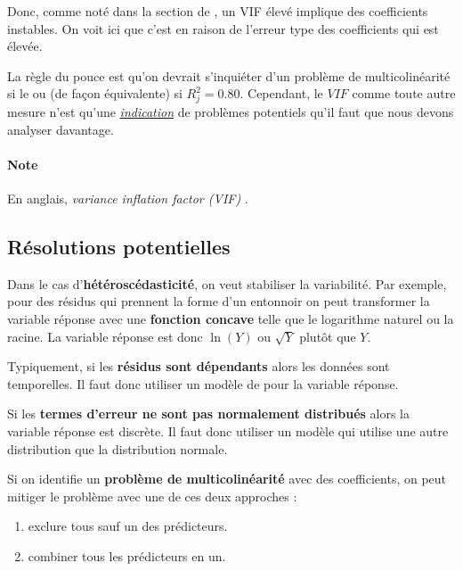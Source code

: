\documentclass[french]{article}
\begin{document}
\begin{multicols*}{2}
\begin{definitionNOHFILL}
\bigskip

Donc, comme noté dans la section de \textit{\underline{}}, un VIF élevé implique des coefficients instables. On voit ici que c'est en raison de l'erreur type des coefficients qui est élevée.

\bigskip

La règle du pouce est qu'on devrait s'inquiéter d'un problème de multicolinéarité si le  ou (de façon équivalente) si $R^{2}_{j} = 0.80$. Cependant, le $VIF$ comme toute autre mesure n'est qu'une \underline{\textit{indication}} de problèmes potentiels qu'il faut que nous devons analyser davantage.

\paragraph{Note}	En anglais, \og \textit{variance inflation factor (VIF)} \fg{}.
\end{definitionNOHFILL}




\columnbreak
\subsection{Résolutions potentielles}
Dans le cas d'\textbf{hétéroscédasticité}, on veut stabiliser la variabilité. Par exemple, pour des résidus qui prennent la forme d'un entonnoir on peut transformer la variable réponse avec une \textbf{fonction concave} telle que le logarithme naturel ou la racine. La variable réponse est donc $\ln(Y)$ ou $\sqrt{Y}$ plutôt que $Y$.

\bigskip

Typiquement, si les \textbf{résidus sont dépendants} alors les données sont temporelles. Il faut donc utiliser un modèle de \textit{\underline{}} pour la variable réponse.

\bigskip

Si les \textbf{termes d'erreur ne sont pas normalement distribués} alors la variable réponse est discrète. Il faut donc utiliser un modèle qui utilise une autre distribution que la distribution normale.

\bigskip

Si on identifie un \textbf{problème de multicolinéarité} avec des coefficients, on peut mitiger le problème avec une de ces deux approches :
\begin{enumerate}[label = \circled{\arabic*}{trueblue}]
	\item	exclure tous sauf un des prédicteurs.
	\item	combiner tous les prédicteurs en un.
\end{enumerate}



\end{multicols*}
\end{document}
